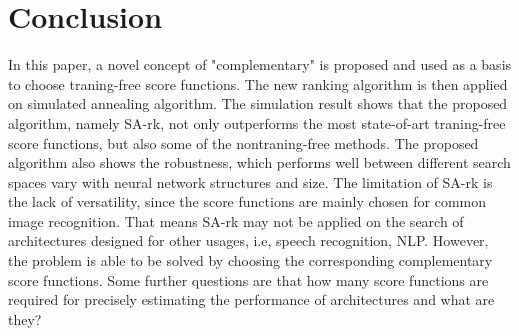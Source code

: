\documentclass[sigconf]{acmart}
\begin{document}
    \section{Conclusion}
    \label{sec:conclusion}
    In this paper, a novel concept of "complementary" is proposed and used as a basis to choose 
    traning-free score functions. The new ranking algorithm is then applied on simulated annealing 
    algorithm. The simulation result shows that the proposed algorithm, namely SA-rk, not only outperforms the most 
    state-of-art traning-free score functions, but also some of the nontraning-free methods. 
    The proposed algorithm also shows the robustness, which performs well between different search 
    spaces vary with neural network structures and size. 
    The limitation of SA-rk is the lack of versatility, since the score functions are mainly chosen 
    for common image recognition. That means SA-rk may not be applied on the search of architectures 
    designed for other usages, i.e, speech recognition, NLP. However, the problem is able to be solved 
    by choosing the corresponding complementary score functions. Some further questions are that how many 
    score functions are required for precisely estimating the performance of architectures and what are they? 
    
    
    
\end{document}
